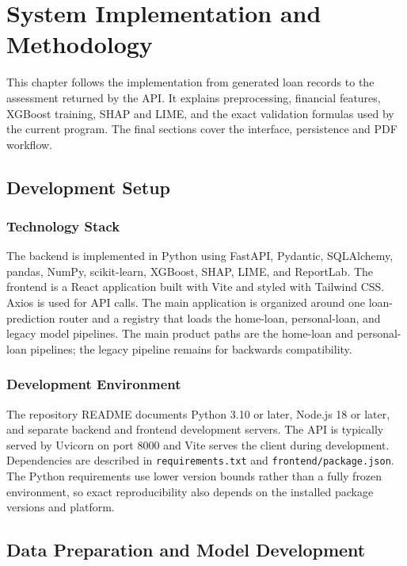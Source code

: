 \chapter[SYSTEM IMPLEMENTATION AND METHODOLOGY]{System Implementation and Methodology}

This chapter follows the implementation from generated loan records to the assessment returned by the API. It explains preprocessing, financial features, XGBoost training, SHAP and LIME, and the exact validation formulas used by the current program. The final sections cover the interface, persistence and PDF workflow.

\section{Development Setup}
\subsection{Technology Stack}
The backend is implemented in Python using FastAPI, Pydantic, SQLAlchemy, pandas, NumPy, scikit-learn, XGBoost, SHAP, LIME, and ReportLab. The frontend is a React application built with Vite and styled with Tailwind CSS. Axios is used for API calls. The main application is organized around one loan-prediction router and a registry that loads the home-loan, personal-loan, and legacy model pipelines. The main product paths are the home-loan and personal-loan pipelines; the legacy pipeline remains for backwards compatibility.

\subsection{Development Environment}
The repository README documents Python 3.10 or later, Node.js 18 or later, and separate backend and frontend development servers. The API is typically served by Uvicorn on port 8000 and Vite serves the client during development. Dependencies are described in \texttt{requirements.txt} and \texttt{frontend/package.json}. The Python requirements use lower version bounds rather than a fully frozen environment, so exact reproducibility also depends on the installed package versions and platform.

\section{Data Preparation and Model Development}
